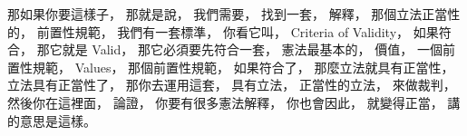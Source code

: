 \hypertarget{w02:cue:2657}{}那如果你要這樣子，
\hypertarget{w02:cue:2658}{}那就是說，
\hypertarget{w02:cue:2659}{}我們需要，
\hypertarget{w02:cue:2660}{}找到一套，
\hypertarget{w02:cue:2661}{}解釋，
\hypertarget{w02:cue:2662}{}那個立法正當性的，
\hypertarget{w02:cue:2663}{}前置性規範，
\hypertarget{w02:cue:2664}{}我們有一套標準，
\hypertarget{w02:cue:2665}{}你看它叫，
\hypertarget{w02:cue:2666}{}Criteria of Validity，
\hypertarget{w02:cue:2667}{}如果符合，
\hypertarget{w02:cue:2668}{}那它就是 Valid，
\hypertarget{w02:cue:2669}{}那它必須要先符合一套，
\hypertarget{w02:cue:2670}{}憲法最基本的，
\hypertarget{w02:cue:2671}{}價值，
\hypertarget{w02:cue:2672}{}一個前置性規範，
\hypertarget{w02:cue:2673}{}Values，
\hypertarget{w02:cue:2674}{}那個前置性規範，
\hypertarget{w02:cue:2675}{}如果符合了，
\hypertarget{w02:cue:2676}{}那麼立法就具有正當性，
\hypertarget{w02:cue:2677}{}立法具有正當性了，
\hypertarget{w02:cue:2678}{}那你去運用這套，
\hypertarget{w02:cue:2679}{}具有立法，
\hypertarget{w02:cue:2680}{}正當性的立法，
\hypertarget{w02:cue:2681}{}來做裁判，
\hypertarget{w02:cue:2682}{}然後你在這裡面，
\hypertarget{w02:cue:2683}{}論證，
\hypertarget{w02:cue:2684}{}你要有很多憲法解釋，
\hypertarget{w02:cue:2685}{}你也會因此，
\hypertarget{w02:cue:2686}{}就變得正當，
\hypertarget{w02:cue:2687}{}講的意思是這樣。

